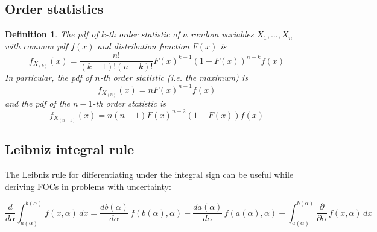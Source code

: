 \documentclass[letter, 11pt]{article}
\theoremstyle{basic}
\newtheorem{definition}{Definition}[section]
\begin{document}
\begin{spacing}{1.0}
\subsection{Order statistics}

\begin{definition}
  The pdf of $k$-th order statistic of $n$ random variables $X_1, \ldots, X_n$
  with common pdf $f(x)$ and distribution function $F(x)$ is \[f_{X_{(k)}}(x) =
  \frac{n!}{(k-1)!(n-k)!}F(x)^{k-1}\left(1-F(x)\right)^{n-k} f(x)\] In
  particular, the pdf of $n$-th order statistic (i.e. the maximum)
  is \[f_{X_{(n)}}(x) = n F(x)^{n-1} f(x)\] and the pdf of the $n-1$-th order
  statistic is \[f_{X_{(n-1)}}(x) = n(n-1) F(x)^{n-2} \left(1-F(x)\right) f(x)\]
\end{definition}

\subsection{Leibniz integral rule}

The Leibniz rule for differentiating under the integral sign can be useful while
deriving FOCs in problems with uncertainty:

\[\frac{d}{d\alpha}\int_{a(\alpha)}^{b(\alpha)} f(x,\alpha)\,dx = \frac{d b(\alpha)}{d \alpha}\,f(b(\alpha),\alpha)-\frac{d a(\alpha)}{d \alpha}\,f(a(\alpha),\alpha)+ \int_{a(\alpha)}^{b(\alpha)}\frac{\partial}{\partial \alpha}\,f(x,\alpha)\,dx\]

\end{spacing}
\end{document}
